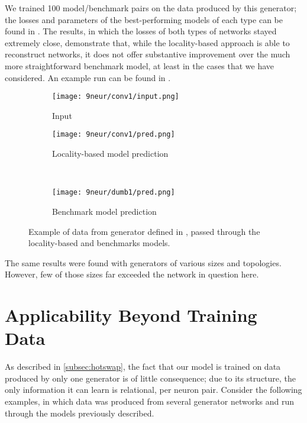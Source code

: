 We trained 100 model/benchmark pairs on the data produced by this generator; the 
losses and parameters of the best-performing models of each type can be found in 
. The results, in which the losses of both types 
of networks stayed extremely close, demonstrate that, while the locality-based 
approach is able to reconstruct networks, it does not offer substantive 
improvement over the much more straightforward benchmark model, at least in the 
cases that we have considered.  An example run can be found in 
.

\begin{figure}[h]
	\centering
	\hfill
	\begin{subfigure}{.2\textwidth}
		\centering
		\texttt{[image: 9neur/conv1/input.png]}
		\caption{Input}
	\end{subfigure}
	\hspace{2em}
	\begin{minipage}{.65\textwidth}
		\centering
	\begin{subfigure}{.9\textwidth}
		\centering
		\texttt{[image: 9neur/conv1/pred.png]}
		\caption{Locality-based model prediction}
	\end{subfigure}\\
	\begin{subfigure}{.9\textwidth}
		\centering
		\texttt{[image: 9neur/dumb1/pred.png]}
		\caption{Benchmark model prediction}
	\end{subfigure}
	\end{minipage}
	\caption{Example of data from generator defined in , 
	passed through the locality-based and benchmarks models.}
	\label{fig:samepred}
\end{figure}\noindent
\newpage
The same results were found with generators of various sizes and topologies.  
However, few of those sizes far exceeded the network in question here.  

\section{Applicability Beyond Training Data}
As described in \ref{subsec:hotswap}, the fact that our model is trained on data 
produced by only one generator is of little consequence; due to its structure, 
the only information it can learn is relational, per neuron pair. Consider the 
following examples, in which data was produced from several generator networks 
and run through the models previously described.

